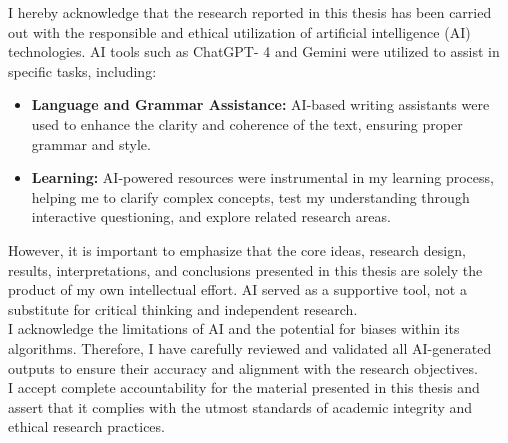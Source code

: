I hereby acknowledge that the research reported in this thesis has been carried out with the responsible and ethical utilization of artificial intelligence (AI) technologies. AI tools such as ChatGPT- 4 and Gemini were utilized to assist in specific tasks, including:


\begin{itemize}
    \item \textbf{Language and Grammar Assistance:} AI-based writing assistants were used to enhance the clarity and coherence of the text, ensuring proper grammar and style.
    \item \textbf{Learning:} AI-powered resources were instrumental in my learning process, helping me to clarify complex concepts, test my understanding through interactive questioning, and explore related research areas.
\end{itemize}


\noindent However, it is important to emphasize that the core ideas, research design, results, interpretations, and conclusions presented in this thesis are solely the product of my own intellectual effort. AI served as a supportive tool, not a substitute for critical thinking and independent research.\\

\noindent I acknowledge the limitations of AI and the potential for biases within its algorithms. Therefore, I have carefully reviewed and validated all AI-generated outputs to ensure their accuracy and alignment with the research objectives.\\

\noindent I accept complete accountability for the material presented in this thesis and assert that it complies with the utmost standards of academic integrity and ethical research practices.
